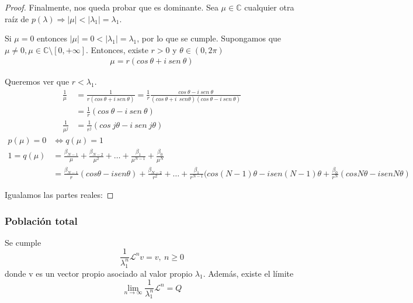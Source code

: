 \begin{proof}
        Finalmente, nos queda probar que es dominante. Sea $\mu \in \mathbb C$ cualquier otra raíz de $p(\lambda) \Rightarrow |\mu| < |\lambda_1| = \lambda_1$.

        Si $\mu = 0$ entonces $|\mu| = 0 < |\lambda_1| = \lambda_1$, por lo que se cumple. Supongamos que $\mu \neq 0, \mu \in \mathbb C \setminus [0, +\infty]$. Entonces, existe $r > 0$ y $\theta \in (0, 2\pi)$
        \begin{align*}
            \label{}
            \mu = r(cos \ \theta + i \ sen \ \theta)
        \end{align*}

        Queremos ver que $ r < \lambda_1$.
        \begin{align*}
            \label{}
            \frac{1}{\mu} &= \frac{1}{r(cos \ \theta + i \ sen \ \theta)} = \frac{1}{r}\frac{cos \ \theta - i \ sen \ \theta}{(cos \ \theta + i \ \ sen \theta)(cos \ \theta - i \ sen \ \theta)} \\
                          &= \frac{1}{r}(cos \ \theta - i \ sen \ \theta) \\
            \frac{1}{\mu^j} &=  \frac{1}{r^j}(cos \ j\theta - i \ sen \ j\theta)
        \end{align*}
        \begin{align*}
            \label{eq:}
            p(\mu) = 0 &\iff q(\mu) = 1\\
            1 = q(\mu) &= \frac{\beta_{N-1}}{\mu} + \frac{\beta_{N-2}}{\mu^2} + \hdots + \frac{\beta_{1}}{\mu^{N-1}} + \frac{\beta_{0}}{\mu^N} \\
                       &= \frac{\beta_{N-1}}{r}(cos\theta - isen\theta) + \frac{\beta_{N-2}}{r^2}+\hdots+\frac{\beta_1}{r^{N-1}}(cos(N-1)\theta - isen(N-1)\theta+\frac{\beta_0}{r^N}(cosN\theta -isenN\theta)
        \end{align*}

	Igualamos las partes reales:

     \end{proof}


     \subsubsection{Población total}
     \label{ssub:poblaci_n_total}

     Se cumple $$\frac{1}{\lambda_1^n}\mathcal L^n v = v, \ n \geq 0$$ donde v es un vector propio asociado al valor propio $\lambda_1$. Además, existe el límite $$\lim_{n \to \infty} \frac{1}{\lambda_1^n} \mathcal L^n = Q$$

